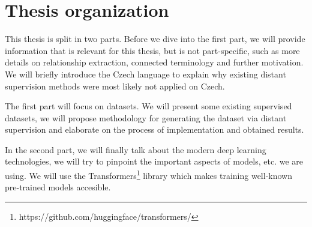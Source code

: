 \section{Thesis organization}
This thesis is split in two parts. Before we dive into the first part, we will provide information that is relevant for this thesis, but is not part-specific, such as more details on relationship extraction, connected terminology and further motivation. We will briefly introduce the Czech language to explain why existing distant supervision methods were most likely not applied on Czech. 

The first part will focus on datasets. We will present some existing supervised datasets, we will propose methodology for generating the dataset via distant supervision and elaborate on the process of implementation and obtained results.   

In the second part, we will finally talk about the modern deep learning technologies, we will try to pinpoint the important aspects of models, etc. we are using. We will use the Transformers\footnote{https://github.com/huggingface/transformers/} library which makes training well-known pre-trained models accesible. 